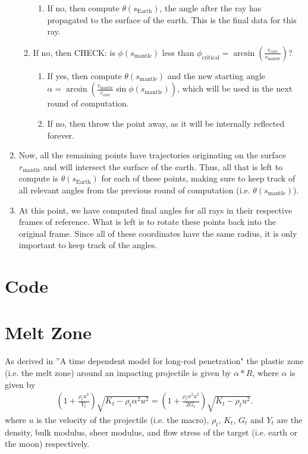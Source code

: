 \documentclass{article}
\newcommand*\te[1]{\text{#1}}
\newcommand*\p[1]{\left(#1\right)}
\newcommand*\f[2]{\frac{#1}{#2}}
\begin{document}
\begin{enumerate}
\begin{enumerate}
\begin{enumerate}
\item If no, then compute $\theta(s_{\te{Earth}})$, the angle after the ray has propagated to the surface of the earth. This is the final data for this ray.
\end{enumerate}
\item If no, then CHECK: is $\phi(s_{\te{mantle}})$ less than $\phi_{\te{critical}}=\arcsin\p{\f{v_{\te{core}}}{v_{\te{mantle}}}}$?
\begin{enumerate}
\item If yes, then compute $\theta(s_{\te{mantle}})$ and the new starting angle $\alpha=\arcsin\p{\f{v_{\te{mantle}}}{v_{\te{core}}}\sin\phi(s_{\te{mantle}})}$, which will be used in the next round of computation.
\item If no, then throw the point away, as it will be internally reflected forever.
\end{enumerate}
\end{enumerate}
\item Now, all the remaining points have trajectories originating on the surface $r_{\te{mantle}}$ and will intersect the surface of the earth. Thus, all that is left to compute is $\theta(s_{\te{Earth}})$ for each of these points, making sure to keep track of all relevant angles from the previous round of computation (i.e. $\theta(s_{\te{mantle}})$).
\item At this point, we have computed final angles for all rays in their respective frames of reference. What is left is to rotate these points back into the original frame. Since all of these coordinates have the same radius, it is only important to keep track of the angles.
\end{enumerate}
\pagebreak
\section{Code}
\pagebreak
\section{Melt Zone}
As derived in ''A time dependent model for long-rod penetration" the plastic zone (i.e. the melt zone) around an impacting projectile is given by $\alpha*R$, where $\alpha$ is given by 
\begin{align}
(1+\frac{\rho_t u^2}{Y_t})\sqrt{K_t - \rho_t \alpha^2 u^2} = (1+\frac{\rho_t \alpha^2 u^2}{2G_t})\sqrt{K_t - \rho_t u^2}.
\end{align}
where $u$ is the velocity of the projectile (i.e. the macro), $\rho_t$, $K_t$, $G_t$ and $Y_t$ are the density, bulk modulus, sheer modulus, and flow stress of the target (i.e. earth or the moon) respectively.
\end{document}
